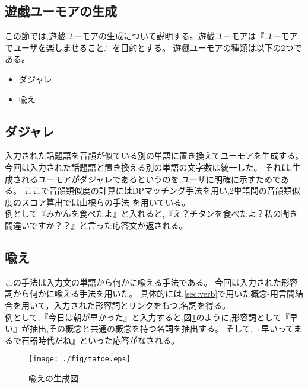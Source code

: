 \subsection{遊戯ユーモアの生成}\label{sec:game}
この節では,遊戯ユーモアの生成について説明する。遊戯ユーモアは『ユーモアでユーザを楽しませること』を目的とする。
遊戯ユーモアの種類は以下の2つである。
\begin{itemize}
\item ダジャレ
\item 喩え
\end{itemize}



\subsection{ダジャレ}\label{sec:punpun}
入力された話題語を音韻が似ている別の単語に置き換えてユーモアを生成する。
今回は入力された話題語と置き換える別の単語の文字数は統一した。
それは,生成されるユーモアがダジャレであるというのを,ユーザに明確に示すためである。
ここで音韻類似度の計算にはDPマッチング手法\cite{dpmatching}\cite{dpcite}を用い,2単語間の音韻類似度のスコア算出では山根らの手法
\cite{Yamane}を用いている。\\
\hspace{1zw}例として『みかんを食べたよ』と入れると,『え？チタンを食べたよ？私の聞き間違いですか？？』と言った応答文が返される。



\subsection{喩え}
この手法は入力文の単語から何かに喩える手法である\cite{Nakamura}。
今回は入力された形容詞から何かに喩える手法を用いた。
具体的には,\ref{sec:verb}で用いた概念-用言間結合を用いて，入力された形容詞とリンクをもつ,名詞を得る。\\
\hspace{1zw}例として,『今日は朝が早かった』と入力すると,図\ref{fig:tatoe}のように,形容詞として『早い』が抽出,その概念と共通の概念を持つ名詞を抽出する。
そして,『早いってまるで石器時代だね』といった応答がなされる。

\begin{figure}[tb]
 \begin{center}
  \texttt{[image: ./fig/tatoe.eps]}
  \caption{喩えの生成図}
  \label{fig:tatoe}
 \end{center}
\end{figure}


